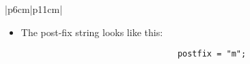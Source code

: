 \begin{center}
\begin{longtable}{ |p{6cm}|p{11cm}| }
\begin{itemize}
                    \item The post-fix string looks like this: 
                        {
                            \begin{verbatim}
                                postfix = "m";
                            \end{verbatim}
                        }
                \end{itemize}
            \\
            
        \hline
        \hline
             \\
        
        

\end{longtable}
\end{center}
